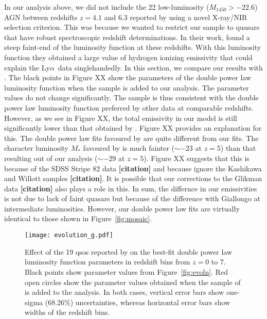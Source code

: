 \documentclass[a4paper,fleqn,usenatbib]{mnras}
\def\lya{Ly$\alpha$~}
\newcommand{\gk}[1]{{\bf \color{notecolor} [#1]}}
\begin{document}
In our analysis above, we did not include the 22 low-luminosity
($M_{1450}>-22.6$) AGN between redshifts $z=4.1$ and $6.3$ reported by
\citet{2015AA...578A..83G} using a novel X-ray/NIR selection
criterion.  This was because we wanted to restrict our sample to
quasars that have robust spectroscopic redshift determinations.  In
their work, \citet{2015AA...578A..83G} found a steep faint-end of the
luminosity function at these redshifts.  With this luminosity function
they obtained a large value of hydrogen ionizing emissivity that could
explain the \lya data singlehandedly.  In this section, we compare our
results with \citet{2015AA...578A..83G}.  The black points in Figure
XX show the parameters of the double power law luminosity function
when the \citet{2015AA...578A..83G} sample is added to our analysis.
The parameter values do not change significantly.  The
\citet{2015AA...578A..83G} sample is thus consistent with the double
power law luminosity function preferred by other data at comparable
redshifts.  However, as we see in Figure XX, the total emissivity in
our model is still significantly lower than that obtained by
\citet{2015AA...578A..83G}.  Figure XX provides an explanation for
this. The double power law fits favoured by \citet{2015AA...578A..83G}
are quite different from our fits.  The character luminosity $M_*$
favoured by \citet{2015AA...578A..83G} is much fainter ($\sim -23$ at
$z = 5$) than that resulting out of our analysis ($\sim -29$ at $z =
5$).  Figure XX suggests that this is because of the SDSS Stripe 82
data \gk{citation} and because \citet{2015AA...578A..83G} ignore the
Kashikawa and Willott samples \gk{citation}.  It is possible that our
corrections to the Glikman data \gk{citation} also plays a role in
this.  In sum, the differnce in our emissivities is not due to lack of
faint quasars but because of the difference with Giallongo at
intermediate luminosities.  However, our double power law fits are
virtually identical to those shown in Figure~\ref{fig:mosaic}.


\begin{figure*}
  \begin{center}
    \texttt{[image: evolution\_g.pdf]}
  \end{center}
  \caption{Effect of the 19 qsos reported by
    \citet{2015AA...578A..83G} on the best-fit double power law
    luminosity function parameters in redshift bins from $z=0$ to $7$.
    Black points show parameter values from Figure~\ref{fig:evoln}.
    Red open circles show the parameter values obtained when the
    sample of \citet{2015AA...578A..83G} is added to the analysis.  In
    both cases, vertical error bars show one-sigma (68.26\%)
    uncertainties, whereas horizontal error bars show widths of the
    redshift bins.}
\end{figure*}
\end{document}

